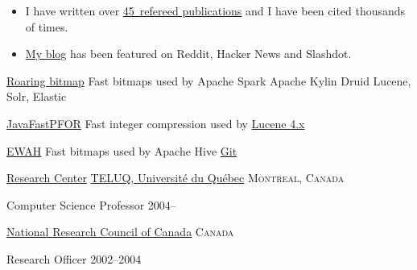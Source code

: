 \documentclass[12pt]{article} %
\begin{document}
\begin{itemize}
  \item
I have written over \href{https://scholar.google.com/citations?user=q1ja-G8AAAAJ}{45~refereed publications} and I have been cited
thousands of times.
\item
\href{http://lemire.me/blog/}{My blog} has been featured on
Reddit, Hacker News and Slashdot.
\end{itemize}




\inlineheadsection %
{\href{http://roaringbitmap.org/}{Roaring bitmap}}
{Fast bitmaps used by Apache Spark \bull   Apache Kylin \bull   Druid  \bull Lucene, Solr, Elastic }

\vspace{0.2cm}


\inlineheadsection
{\href{https://github.com/lemire/JavaFastPFOR}{JavaFastPFOR}}
{Fast integer compression used by  \href{http://lucene.apache.org/core/4_6_1/core/org/apache/lucene/util/PForDeltaDocIdSet.html}{Lucene 4.x}}

\vspace{0.2cm}

\inlineheadsection %
{\href{https://github.com/lemire/javaewah}{EWAH}}
{Fast bitmaps used by Apache Hive \bull \href{http://githubengineering.com/counting-objects/}{Git}}





\headedsection %
{\href{http://licef.ca}{ Research Center} \bull \href{http://www.teluq.ca/siteweb/univ/dlemire.html}{TELUQ, Universit\'e du Qu\'ebec}}
{\textsc{Montreal, Canada}} {

\headedsubsection %
{Computer Science Professor}
{2004--}
{}

}
\headedsection
{\href{http://www.nrc-cnrc.gc.ca/}{National Research Council of Canada}}
{\textsc{Canada}} {

\headedsubsection %
{Research Officer}
{2002--2004}
{
}
}
\end{document}
